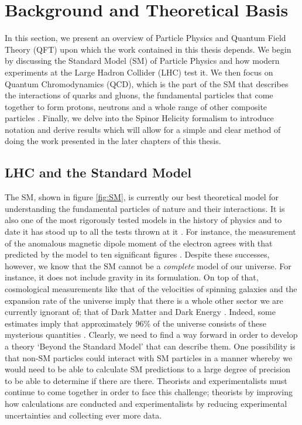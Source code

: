 \chapter{Background and Theoretical Basis}

In this section, we present an overview of Particle Physics and Quantum Field Theory (QFT) upon which the work contained in this thesis depends. We begin by discussing the Standard Model (SM) of Particle Physics and how modern experiments at the Large Hadron Collider (LHC) test it. We then focus on Quantum Chromodynamics (QCD), which is the part of the SM that describes the interactions of quarks and gluons, the fundamental particles that come together to form protons, neutrons and a whole range of other composite particles \cite{PDG}. Finally, we delve into the Spinor Helicity formalism \cite{Elvang2013} to introduce notation and derive results which will allow for a simple and clear method of doing the work presented in the later chapters of this thesis. 

\section{LHC and the Standard Model}

The SM, shown in figure \ref{fig:SM}, is currently our best theoretical model for understanding the fundamental particles of nature and their interactions. It is also one of the most rigorously tested models in the history of physics and to date it has stood up to all the tests thrown at it \cite{Ellis1995}. For instance, the measurement of the anomalous magnetic dipole moment of the electron agrees with that predicted by the model to ten significant figures \cite{Aoyama2012}. Despite these successes, however, we know that the SM cannot be a \emph{complete} model of our universe. For instance, it does not include gravity in its formulation. On top of that, cosmological measurements like that of the velocities of spinning galaxies and the expansion rate of the universe imply that there is a whole other sector we are currently ignorant of; that of Dark Matter and Dark Energy \cite{Bertone2005}. Indeed, some estimates imply that approximately 96\% of the universe consists of these mysterious quantities \cite{Jarosik2011}. Clearly, we need to find a way forward in order to develop a theory `Beyond the Standard Model' that can describe them. One possibility is that non-SM particles could interact with SM particles in a manner whereby we would need to be able to calculate SM predictions to a large degree of precision to be able to determine if there are there. Theorists and experimentalists must continue to come together in order to face this challenge; theorists by improving how calculations are conducted and experimentalists by reducing experimental uncertainties and collecting ever more data. \\

